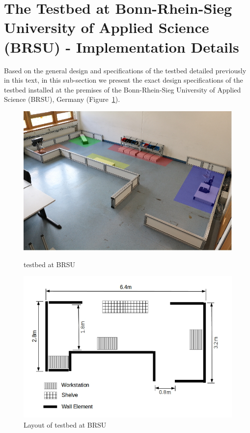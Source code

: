 


\section{The \erlir Testbed at Bonn-Rhein-Sieg University of Applied Science (BRSU) - Implementation Details}
\label{ssec:IST_atHometestbed}

Based on the general design and specifications of the \erlir testbed detailed previously in this text, in this sub-section we present the exact design specifications of the \erlir testbed installed at the premises of the Bonn-Rhein-Sieg University of Applied Science (BRSU), Germany (Figure~\ref{fig:BRSU_atwork_dimension}). 

\begin{figure}[htb]
 \begin{center}
 \includegraphics[width=12.5cm]{./fig/WorkArenaBRSUSpatialArea.jpg} 
 \caption{\erlir testbed at BRSU}
 \label{fig:BRSU_atwork_layout}
 
  \includegraphics[width=12.5cm]{./fig/WorkArenaBRSUSpatialAreaDimension.jpg} 
 \caption{Layout of \erlir testbed at BRSU}
 \label{fig:BRSU_atwork_dimension}
 \end{center}
\end{figure}


